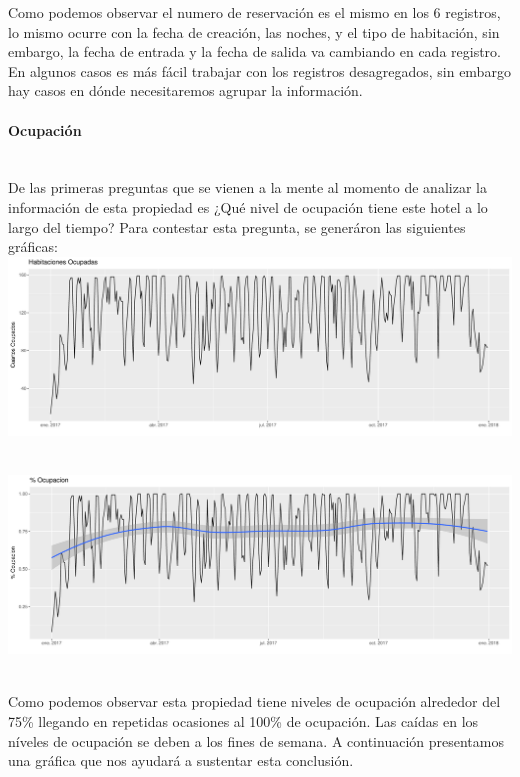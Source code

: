 \documentclass{article}\usepackage[]{graphicx}\usepackage[]{color}
\makeatletter
\def\maxwidth{ %
  \ifdim\Gin@nat@width>\linewidth
    \linewidth
  \else
    \Gin@nat@width
  \fi
}
\newenvironment{knitrout}{}{} %
\makeatother
\begin{document}
Como podemos observar el numero de reservación es el mismo en los 6 registros, lo mismo ocurre con la fecha de creación, las noches, y el tipo de habitación, sin embargo, la fecha de entrada y la fecha de salida va cambiando en cada registro. En algunos casos es más fácil trabajar con los registros desagregados, sin embargo hay casos en dónde necesitaremos agrupar la información.

\paragraph{Ocupación} ~\\
De las primeras preguntas que se vienen a la mente al momento de analizar la información de esta propiedad es ¿Qué nivel de ocupación tiene este hotel a lo largo del tiempo? Para contestar esta pregunta, se generáron las siguientes gráficas:
~\\
\begin{knitrout}
\color{fgcolor}
\includegraphics[width=\maxwidth]{figures/HabitacionesOcupadas-1} 

\end{knitrout}
~\\
\begin{knitrout}
\color{fgcolor}
\includegraphics[width=\maxwidth]{figures/Ocupacion-1} 

\end{knitrout}
~\\
Como podemos observar esta propiedad tiene niveles de ocupación alrededor del 75\% llegando en repetidas ocasiones al 100\% de ocupación. Las caídas en los níveles de ocupación se deben a los fines de semana. A continuación presentamos una gráfica que nos ayudará a sustentar esta conclusión.
\end{document}
